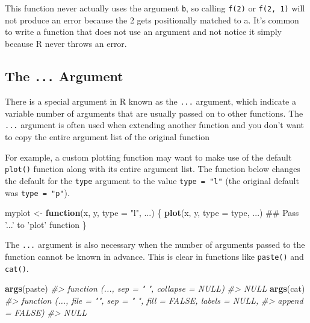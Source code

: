 \documentclass[]{book}
\newenvironment{Shaded}{\begin{snugshade}}{\end{snugshade}}
\newcommand{\CommentTok}[1]{\textcolor[rgb]{0.56,0.35,0.01}{\textit{#1}}}
\newcommand{\ControlFlowTok}[1]{\textcolor[rgb]{0.13,0.29,0.53}{\textbf{#1}}}
\newcommand{\DataTypeTok}[1]{\textcolor[rgb]{0.13,0.29,0.53}{#1}}
\newcommand{\KeywordTok}[1]{\textcolor[rgb]{0.13,0.29,0.53}{\textbf{#1}}}
\newcommand{\NormalTok}[1]{#1}
\newcommand{\StringTok}[1]{\textcolor[rgb]{0.31,0.60,0.02}{#1}}
\theoremstyle{definition}
\theoremstyle{definition}
\theoremstyle{definition}
\theoremstyle{remark}
\begin{document}
This function never actually uses the argument \texttt{b}, so calling
\texttt{f(2)} or \texttt{f(2,\ 1)} will not produce an error because the
2 gets positionally matched to a. It's common to write a function that
does not use an argument and not notice it simply because R never throws
an error.

\hypertarget{the-...-argument}{%
\subsection{\texorpdfstring{The \texttt{...}
Argument}{The ... Argument}}\label{the-...-argument}}

There is a special argument in R known as the \texttt{...} argument,
which indicate a variable number of arguments that are usually passed on
to other functions. The \texttt{...} argument is often used when
extending another function and you don't want to copy the entire
argument list of the original function

For example, a custom plotting function may want to make use of the
default \texttt{plot()} function along with its entire argument list.
The function below changes the default for the \texttt{type} argument to
the value \texttt{type\ =\ "l"} (the original default was
\texttt{type\ =\ "p"}).

\begin{Shaded}
\begin{Highlighting}[]
\NormalTok{myplot <-}\StringTok{ }\ControlFlowTok{function}\NormalTok{(x, y, }\DataTypeTok{type =} \StringTok{"l"}\NormalTok{, ...) \{}
        \KeywordTok{plot}\NormalTok{(x, y, }\DataTypeTok{type =}\NormalTok{ type, ...)         ## Pass '...' to 'plot' function}
\NormalTok{\}}
\end{Highlighting}
\end{Shaded}

The \texttt{...} argument is also necessary when the number of arguments
passed to the function cannot be known in advance. This is clear in
functions like \texttt{paste()} and \texttt{cat()}.

\begin{Shaded}
\begin{Highlighting}[]
\KeywordTok{args}\NormalTok{(paste)}
\CommentTok{#> function (..., sep = " ", collapse = NULL) }
\CommentTok{#> NULL}
\KeywordTok{args}\NormalTok{(cat)}
\CommentTok{#> function (..., file = "", sep = " ", fill = FALSE, labels = NULL, }
\CommentTok{#>     append = FALSE) }
\CommentTok{#> NULL}
\end{Highlighting}
\end{Shaded}
\end{document}
